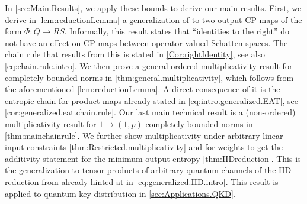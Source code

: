 \documentclass[11pt]{article}
\newcommand{\jk}[1]{\textcolor{cyan}{JK:~#1}}
\DeclareMathOperator{\id}{id}
\newcommand{\1}{\ensuremath{\mathbbm{1}}}
\theoremstyle{newdefinition}
\theoremstyle{newplain}
\theoremstyle{myplain}
\begin{document}
In \cref{sec:Main.Results}, we apply these bounds to derive our main results. First, we derive in \cref{lem:reductionLemma} a generalization of \cite[Lemma 5]{Devetak.2006} to two-output CP maps of the form $\Phi:Q\to RS$. Informally, this result states that ``identities to the right'' do not have an effect on CP maps between operator-valued Schatten spaces.
The chain rule that results from this is stated in \cref{Cor:rightIdentity}, see also \eqref{eq:chain.rule.intro}. %
We then prove a general ordered multiplicativity result for completely bounded norms in \cref{thm:general.multiplicativity}, which follows from the aforementioned \cref{lem:reductionLemma}.
A direct consequence of it is the entropic chain for product maps already stated in \eqref{eq:intro.generalized.EAT}, see \cref{cor:generalized.eat.chain.rule}. %
Our last main technical result is a (non-ordered) multiplicativity result for 
$1\to(1,p)$-completely bounded norms in \cref{thm:mainchainrule}. We further show multiplicativity under arbitrary linear input constraints \cref{thm:Restricted.multiplicativity} and for weights to get the additivity statement for the minimum output entropy \cref{thm:IIDreduction}. This is the generalization to tensor products of arbitrary quantum channels of the IID reduction from \cite{Himbeeck.2025} already hinted at in \eqref{eq:generalized.IID.intro}. This result is applied to quantum key distribution in \cref{sec:Applications.QKD}.
\end{document}
